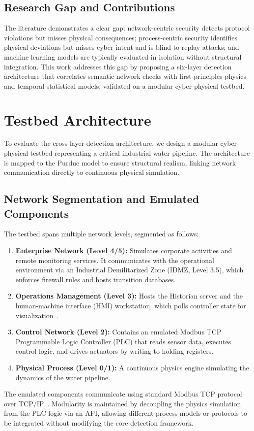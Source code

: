 \documentclass[journal,twoside,web]{ieeecolor}
\begin{document}
\subsection{Research Gap and Contributions}
The literature demonstrates a clear gap: network-centric security detects protocol violations but misses physical consequences; process-centric security identifies physical deviations but misses cyber intent and is blind to replay attacks; and machine learning models are typically evaluated in isolation without structural integration. This work addresses this gap by proposing a six-layer detection architecture that correlates semantic network checks with first-principles physics and temporal statistical models, validated on a modular cyber-physical testbed.

\section{Testbed Architecture} \label{subsection:tesbed}

To evaluate the cross-layer detection architecture, we design a modular cyber-physical testbed representing a critical industrial water pipeline. The architecture is mapped to the Purdue model to ensure structural realism, linking network communication directly to continuous physical simulation.

\subsection{Network Segmentation and Emulated Components}
The testbed spans multiple network levels, segmented as follows:
\begin{enumerate}
    \item \textbf{Enterprise Network (Level 4/5):} Simulates corporate activities and remote monitoring services. It communicates with the operational environment via an Industrial Demilitarized Zone (IDMZ, Level 3.5), which enforces firewall rules and hosts transition databases.
    \item \textbf{Operations Management (Level 3):} Hosts the Historian server and the human-machine interface (HMI) workstation, which polls controller state for visualization~\cite{maplesystems_hmi}.
    \item \textbf{Control Network (Level 2):} Contains an emulated Modbus TCP Programmable Logic Controller (PLC) that reads sensor data, executes control logic, and drives actuators by writing to holding registers.
    \item \textbf{Physical Process (Level 0/1):} A continuous physics engine simulating the dynamics of the water pipeline.
\end{enumerate}
The emulated components communicate using standard Modbus TCP protocol over TCP/IP~\cite{bitmotec_modbus}. Modularity is maintained by decoupling the physics simulation from the PLC logic via an API, allowing different process models or protocols to be integrated without modifying the core detection framework.
\end{document}
